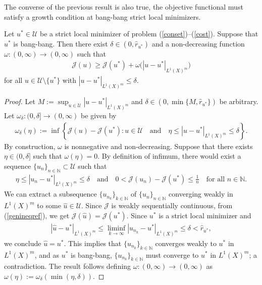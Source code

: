 \documentclass[hidelinks,onefignum,onetabnum]{siamart220329}
\begin{document}
The converse of the previous result is also true, the objective functional must satisfy a growth condition at bang-bang strict local minimizers.

\begin{proposition}\label{growthbang}
	Let $u^*\in\mathcal U$ be a strict local minimizer of problem (\ref{conset})--(\ref{cost}). Suppose that $u^*$ is bang-bang. Then there exist $\delta\in(0,\hat r_{u^*})$ and a non-decreasing function $\omega:(0,\infty)\to(0,\infty)$ such that 
	\begin{align*}
		\mathcal J(u)\ge \mathcal J(u^*)+\omega\big(|u-u^*|_{{L^1(X)^m}}\big)
	\end{align*}
	for all $u\in\mathcal U\setminus\{u^*\}$ with $|u-u^*|_{{L^1(X)^m}}\le\delta$.
\end{proposition}
\begin{proof}
	Let $M:=\sup_{u\in\mathcal U}|u-u^*|_{L^1(X)^m}$ and $\delta\in(0,\min\{M,\hat r_{u^*}\})$ be arbitrary. Let  $\omega_{\delta}:(0,\delta]\to(0,\infty)$ be given by
	\begin{align*}
		\omega_\delta(\eta):=\inf\left\lbrace \mathcal J(u)-\mathcal J(u^*): u\in\mathcal U\quad\text{and}\quad \eta\le|u-u^*|_{{L^1(X)^m}}\le\delta \right\rbrace.
	\end{align*}
	By construction, $\omega$ is nonnegative and  non-decreasing. Suppose that there exists $\eta\in(0,\delta]$ such that $\omega(\eta)=0$. By definition of infimum, there would exist a sequence $\{u_n\}_{n\in\mathbb N}\subset\mathcal U$ such that
	\begin{align}\label{genineqref}
		\eta\le|u_n-u^*|_{L^1(X)^m}\le\delta\quad\text{and}\quad0<\mathcal J(u_n)-\mathcal J(u^*)\le\frac{1}{n}\quad\text{for all $n\in\mathbb N$}.
	\end{align}
	We can extract a subsequence $\{u_{n_k}\}_{k\in\mathbb N}$ of $\{u_{n}\}_{n\in\mathbb N}$ converging weakly in ${L^1(X)^m}$ to some $\hat u\in\mathcal U$. Since $\mathcal J$ is weakly sequentially continuous, from (\ref{genineqref}), we get $\mathcal J(\hat u)=\mathcal J(u^*)$. Since $u^*$ is a strict local minimizer and
	\begin{align*}
		|\hat u-u^*|_{{L^1(X)^m}}\le\liminf_{k\to\infty}|u_{n_k}-u^*|_{{L^1(X)^m}}\le \delta<\hat r_{u^*},
	\end{align*}
	we conclude $\hat u=u^*$. This implies that $\{u_{n_k}\}_{k\in\mathbb N}$ converges weakly to $u^*$ in ${L^1(X)^m}$, and as $u^*$ is bang-bang, $\{u_{n_k}\}_{k\in\mathbb N}$ must converge to $u^*$ in ${L^1(X)^m}$; a contradiction. The result follows defining $\omega:(0,\infty)\to(0,\infty)$ as
	$\omega( \eta ) := \omega_\delta( \min( \eta, \delta ))$.
\end{proof}
\end{document}
